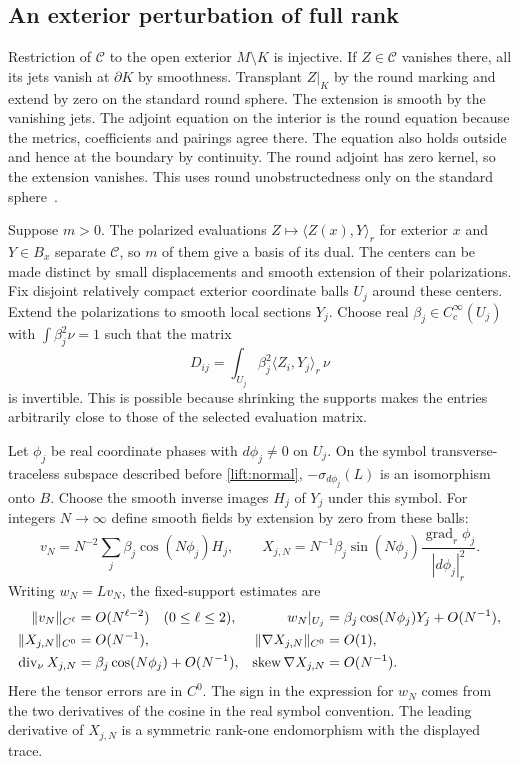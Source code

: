 \documentclass[11pt]{article}
\numberwithin{equation}{section}
\theoremstyle{definition}
\theoremstyle{remark}
\begin{document}
\subsection{An exterior perturbation of full rank}

Restriction of \(\mathcal C\) to the open exterior \(M\setminus K\)
is injective. If \(Z\in\mathcal C\) vanishes there, all its jets
vanish at \(\partial K\) by smoothness. Transplant \(Z|_K\) by
the round marking and extend by zero on the standard round sphere.
The extension is smooth by the vanishing jets. The adjoint
equation on the interior is the round equation because the
metrics, coefficients and pairings agree there. The equation also
holds outside and hence at the boundary by continuity. The
round adjoint has zero kernel, so the extension vanishes.
This uses round unobstructedness only on the standard
sphere~\cite[\S1.1]{GoverGursky2024}.

Suppose \(m>0\). The polarized evaluations
\(Z\mapsto\langle Z(x),Y\rangle_r\) for exterior \(x\) and
\(Y\in B_x\) separate \(\mathcal C\), so \(m\) of them give
a basis of its dual. The centers can be made distinct by
small displacements and smooth extension of their polarizations.
Fix disjoint relatively compact exterior coordinate balls
\(U_j\) around these centers. Extend the polarizations to smooth
local sections \(Y_j\). Choose real \(\beta_j\in C_c^\infty(U_j)\)
with \(\int \beta_j^2\nu=1\) such that the matrix
\begin{equation}
 D_{ij}=\int_{U_j}\beta_j^2\langle Z_i,Y_j\rangle_r\,\nu
 \label{msreg:evalmatrix}
\end{equation}
is invertible. This is possible because shrinking the supports
makes the entries arbitrarily close to those of the selected
evaluation matrix.

Let \(\phi_j\) be real coordinate phases with \(d\phi_j\ne0\)
on \(U_j\). On the symbol transverse-traceless subspace described
before \eqref{lift:normal}, \(-\sigma_{d\phi_j}(L)\) is an
isomorphism onto \(B\). Choose the smooth inverse images
\(H_j\) of \(Y_j\) under this symbol. For integers \(N\to\infty\)
define smooth fields by extension by zero from these balls:
\begin{equation}
 v_N=N^{-2}\sum_j\beta_j\cos(N\phi_j)H_j,\qquad
 X_{j,N}=N^{-1}\beta_j\sin(N\phi_j)
                \frac{\operatorname{grad}_r\phi_j}{|d\phi_j|_r^2}.
 \label{msreg:probes}
\end{equation}
Writing \(w_N=Lv_N\), the fixed-support estimates are
\begin{align}
 \|v_N\|_{C^\ell}&=O(N^{\ell-2})\quad(0\le\ell\le2),
 &w_N|_{U_j}&=\beta_j\cos(N\phi_j)Y_j+O(N^{-1}),\notag\\
 \|X_{j,N}\|_{C^0}&=O(N^{-1}),
 &\|\nabla X_{j,N}\|_{C^0}&=O(1),\notag\\
 \operatorname{div}_\nu X_{j,N}&=\beta_j\cos(N\phi_j)+O(N^{-1}),
 &\operatorname{skew}\nabla X_{j,N}&=O(N^{-1}).
 \label{msreg:oscest}
\end{align}
Here the tensor errors are in \(C^0\). The sign in the expression
for \(w_N\) comes from the two derivatives of the cosine in the
real symbol convention. The leading derivative of \(X_{j,N}\)
is a symmetric rank-one endomorphism with the displayed trace.
\end{document}
